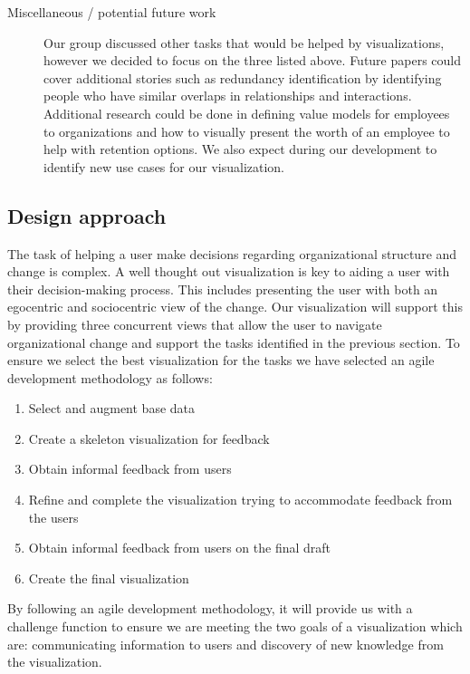 \documentclass[12pt,letterpaper]{article}
\begin{document}
\begin{description}
\item [Miscellaneous / potential future work]Our group discussed other tasks that would be helped by visualizations, however we decided to focus on the three listed above.  Future papers could cover additional stories such as redundancy identification by identifying people who have similar overlaps in relationships and interactions.  Additional research could be done in defining value models for employees to organizations and how to visually present the worth of an employee to help with retention options.  We also expect during our development to identify new use cases for our visualization.  
\end{description}

\subsection{Design approach}

The task of helping a user make decisions regarding organizational structure and change is complex.  A well thought out visualization is key to aiding a user with their decision-making process.  This includes presenting the user with both an egocentric and sociocentric view of the change.  Our visualization will support this by providing three concurrent views that allow the user to navigate organizational change and support the tasks identified in the previous section.  To ensure we select the best visualization for the tasks we have selected an agile development methodology as follows:

\begin{enumerate}
\item Select and augment base data
\item Create a skeleton visualization for feedback
\item Obtain informal feedback from users
\item Refine and complete the visualization trying to accommodate feedback from the users
\item Obtain informal feedback from users on the final draft
\item Create the final visualization
\end{enumerate}

By following an agile development methodology, it will provide us with a challenge function to ensure we are meeting the two goals of a visualization which are: communicating information to users and discovery of new knowledge from the visualization. 
\end{document}
